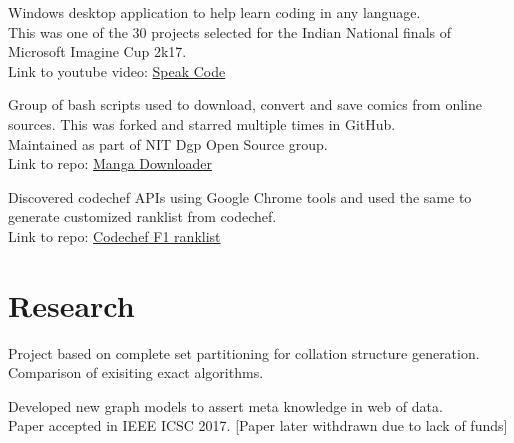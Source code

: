 \documentclass[letterpaper]{deedy-resume} %
\begin{document}
\begin{minipage}[t]{0.66\textwidth}

Windows desktop application to help learn coding in any language. \\
This was one of the 30 projects selected for the Indian National finals of Microsoft Imagine Cup 2k17. \\
Link to youtube video: \href{https://www.youtube.com/watch?v=hO4iSh1bSC0}{Speak Code}

\sectionspace


Group of bash scripts used to download, convert and save comics from online sources. This was forked and starred multiple times in GitHub. \\
Maintained as part of NIT Dgp Open Source group. \\
Link to repo: \href{https://github.com/NITDgpOS/manga}{Manga Downloader}

\sectionspace


Discovered codechef APIs using Google Chrome tools and used the same to generate customized ranklist from codechef. \\
Link to repo: \href{https://github.com/pandusonu2/Codechef-f1-ranklist}{Codechef F1 ranklist}

\sectionspace


\section{Research}


Project based on complete set partitioning for collation structure generation. \\
Comparison of exisiting exact algorithms.

\sectionspace


Developed new graph models to assert meta knowledge in web of data. \\
Paper accepted in IEEE ICSC 2017. [Paper later withdrawn due to lack of funds]


\end{minipage}
\end{document}
